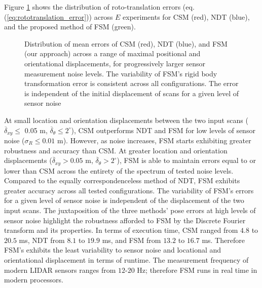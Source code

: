Figure \ref{fig:errors_sm} shows the distribution of roto-translation errors
(eq. (\ref{eq:rototranslation_error})) across $E$ experiments for CSM (red),
NDT (blue), and the proposed method of FSM (green).

\begin{figure}[]\centering
  
  \caption{\small Distribution of mean errors of CSM (red), NDT (blue), and
           FSM (our approach) across a range of maximal positional and
           orientational displacements, for progressively larger sensor
           measurement noise levels. The variability of FSM's rigid body
           transformation error is consistent across all configurations. The
           error is independent of the initial displacement of scans for a
           given level of sensor noise}
  \label{fig:errors_sm}
\end{figure}

At small location and orientation displacements between the two input scans
($\overline{\delta}_{xy} \leq $ 0.05 m,
$\overline{\delta}_\theta \leq 2^\circ$), CSM outperforms NDT and FSM for low
levels of sensor noise ($\sigma_R \leq 0.01$ m). However, as noise increases,
FSM starts exhibiting greater robustness and accuracy than CSM. At
greater location and orientation displacements
($\overline{\delta}_{xy} > 0.05$ m,
$\overline{\delta}_\theta > 2^\circ$), FSM is able to maintain errors equal to
or lower than CSM across the entirety of the spectrum of tested noise levels.
Compared to the equally correspondenceless method of NDT, FSM exhibits greater
accuracy across all tested configurations. The variability of FSM's errors
for a given level of sensor noise is independent of the displacement of the
two input scans. The juxtaposition of the three methods' pose errors at high
levels of sensor noise highlight the robustness afforded to FSM by the Discrete
Fourier transform and its properties. In terms of execution time, CSM ranged
from $4.8$ to $20.5$ ms, NDT from $8.1$ to $19.9$ ms, and FSM from $13.2$ to
$16.7$ ms. Therefore FSM's exhibits the least variability to sensor noise and
locational and orientational displacement in terms of runtime. The measurement
frequency of modern LIDAR sensors ranges from $12$-$20$ Hz; therefore FSM runs
in real time in modern processors.
